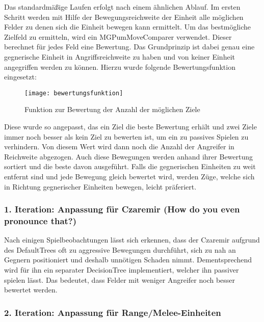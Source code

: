 Das standardmäßige Laufen erfolgt nach einem ähnlichen Ablauf. Im ersten Schritt werden mit Hilfe der Bewegungsreichweite der Einheit alle möglichen Felder zu denen sich die Einheit bewegen kann ermittelt. Um das bestmögliche Zielfeld zu ermitteln, wird ein MGPumMoveComparer verwendet. Dieser berechnet für jedes Feld eine Bewertung. Das Grundprinzip ist dabei genau eine gegnerische Einheit in Angriffsreichweite zu haben und von keiner Einheit angegriffen werden zu können. Hierzu wurde folgende Bewertungsfunktion eingesetzt: 

\begin{figure}[H]
	\centering
	\texttt{[image: bewertungsfunktion]}
	\caption{Funktion zur Bewertung der Anzahl der möglichen Ziele}
	\label{fig:bewertungsfunktion}
\end{figure}

Diese wurde so angepasst, das ein Ziel die beste Bewertung erhält und zwei Ziele immer noch besser als kein Ziel zu bewerten ist, um ein zu passives Spielen zu verhindern. Von diesem Wert wird dann noch die Anzahl der Angreifer in Reichweite abgezogen. Auch diese Bewegungen werden anhand ihrer Bewertung sortiert und die beste davon ausgeführt. Falls die gegnerischen Einheiten zu weit entfernt sind und jede Bewegung gleich bewertet wird, werden Züge, welche sich in Richtung gegnerischer Einheiten bewegen, leicht präferiert.

\subsubsection{1. Iteration: Anpassung für Czaremir (How do you even pronounce that?)}

Nach einigen Spielbeobachtungen lässt sich erkennen, dass der Czaremir aufgrund des DefaultTrees oft zu aggressive Bewegungen durchführt, sich zu nah an Gegnern positioniert und deshalb unnötigen Schaden nimmt. Dementsprechend wird für ihn ein separater DecisionTree implementiert, welcher ihn passiver spielen lässt. Das bedeutet, dass Felder mit weniger Angreifer noch besser bewertet werden.

\subsubsection{2. Iteration: Anpassung für Range/Melee-Einheiten}

